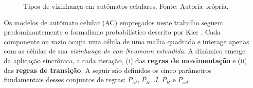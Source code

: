 \documentclass[12pt,oneside]{report}
\begin{document}
\begin{figure}[H]
    \centering
    \hspace{0.05\textwidth}
    \hspace{0.05\textwidth}
    \caption{\small Tipos de vizinhança em autômatos celulares. Fonte: Autoria própria.}
    \label{fig:tipos_vizinhança}
\end{figure}

Os modelos de autômato celular (AC) empregados neste trabalho seguem predominantemente o formalismo probabilístico descrito por Kier \cite{kier2005}. Cada componente ou vazio ocupa uma célula de uma malha quadrada e interage apenas com as células de sua \textit{vizinhança de von Neumann estendida}. A dinâmica emerge da aplicação sincrônica, a cada iteração, (i) das \textbf{regras de movimentação} e (ii) das \textbf{regras de transição}. A seguir são definidos os cinco parâmetros fundamentais desses conjuntos de regras: $P_M$, $P_B$, $J$, $P_R$ e $P_{rot}$.
\end{document}
